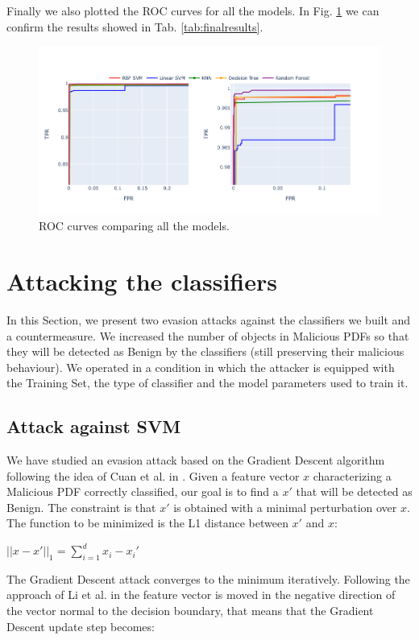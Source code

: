 \documentclass[twocolumn, switch]{article} %
\newcommand\x{0.7}
\begin{document}
Finally we also plotted the ROC curves for all the models. In Fig. \ref{fig:roc} we can  confirm the results showed in Tab. \ref{tab:finalresults}.
\begin{figure}[ht!]
	\centering
	\includegraphics[width=\x\linewidth]{roc.png}
	\caption{ROC curves comparing all the models. }
	\label{fig:roc}
\end{figure}

\section{Attacking the classifiers}
\label{sec:attacks}
In this Section, we present two evasion attacks against the classifiers we built and a countermeasure. We increased the number of objects in Malicious PDFs so that they will be detected as Benign by the classifiers (still preserving their malicious behaviour). We operated in a condition in which the attacker is equipped with the Training Set, the type of classifier and the model parameters used to train it.
\subsection{Attack against SVM}
\label{subsec:svm}
We have studied an evasion attack based on the Gradient Descent algorithm following the idea of Cuan et al. in \cite{cuan_damien_delaplace_valois_2018}. Given
a feature vector $x$ characterizing a Malicious PDF correctly classified, our goal is to find a $x'$ that will be detected as Benign. The constraint is that $x'$ is obtained with a minimal perturbation over $x$. The function to be minimized is the L1 distance between $x'$ and $x$:
\begin{center}
	$||x-x'||_1 = \sum_{i=1}^{d}x_i-x_i'$
\end{center}

The Gradient Descent attack converges to the minimum iteratively. Following the approach of Li et al. in \cite{li_liu_yan_yang_2022} the feature vector is moved in the negative direction of the vector normal to the decision boundary, that means that the Gradient Descent update step becomes:
\end{document}
